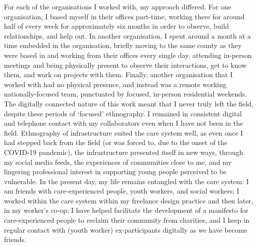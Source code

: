For each of the organisations I worked with, my approach differed. For one organisation, I based myself in their offices part-time, working there for around half of every week for approximately six months in order to observe, build relationships, and help out. In another organisation, I spent around a month at a time embedded in the organisation, briefly moving to the same county as they were based in and working from their offices every single day, attending in-person meetings and being physically present to observe their interactions, get to know them, and work on projects with them. Finally, another organisation that I worked with had no physical presence, and instead was a remote working nationally-focused team, punctuated by focused, in-person residential weekends. The digitally connected nature of this work meant that I never truly left the field, despite these periods of `focused' ethnography. I remained in consistent digital and telephone contact with my collaborators even when I have not been in the field. Ethnography of infrastructure suited the care system well, as even once I had stepped back from the field (or was forced to, due to the onset of the COVID-19 pandemic), the infrastructure presented itself in new ways, through my social media feeds, the experiences of communities close to me, and my lingering professional interest in supporting young people perceived to be vulnerable. In the present day, my life remains entangled with the care system: I am friends with care-experienced people, youth workers, and social workers; I worked within the care system within my freelance design practice and then later, in my worker's co-op; I have helped facilitate the development of a manifesto for care-experienced people to reclaim their community from charities, and I keep in regular contact with (youth worker) ex-participants digitally as we have become friends. 


